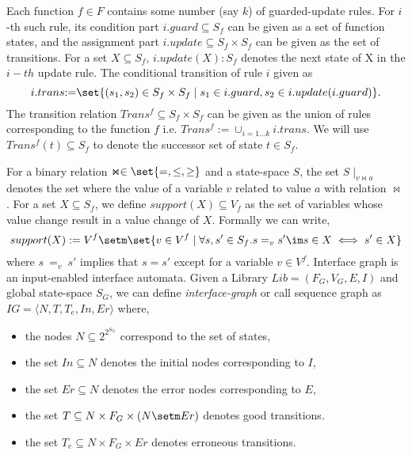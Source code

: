 \documentclass{llncs}
\begin{document}
Each function $f \in F$ contains some number (say $k$) of guarded-update rules. 
For  $i$-th such rule, its condition part $i.guard \subseteq S_f$ can be given as a set of function states, and the assignment part $i.update \subseteq S_f \times S_f$ can be given as the set of transitions.
For a set $X \subseteq S_f$, $i.update (X) : S_f$ denotes the next state of X in the $i-th$ update rule.
The conditional transition of rule $i$ given as 
\[
i.trans { := }  \set{(s_1, s_2) \in S_f \times S_f \mid s_1 \in i.guard, s_2 \in i.update(i.guard)}.
\]
The transition relation $Trans^f \subseteq S_f \times S_f$ can be given as the union of rules corresponding to the function $f$ i.e. $Trans^f {:=} \cup_{i=1 \ldots k}  i.trans$.
We will use $Trans^f (t) \subseteq S_f$ to denote the successor set of state $t \in S_f$.  

For a binary relation $\Join \in \set{=,\leq,\geq}$ and a state-space $S$, the set 
$S\mid_{v \Join a}$ denotes the set where the value of a variable $v$ related to value $a$ with relation $\Join$. 
For a set $X \subseteq S_f$, we define $support(X) \subseteq V_f$  as the set of variables whose
value change result in a value change of $X$.
Formally we can write, 
\[
support(X) := V^f \setm \set{v \in V^f \mid \forall s,s' \in S_f. s =_{v} s'  \im s\in X \iff s' \in X}
\]
where $s\ =_{v}\ s'$ implies that $s=s'$ except for a variable $v \in V^f$.
 Interface graph is an input-enabled interface automata.
 Given a Library $Lib = (F_G,V_G, E, I)$ and global state-space $S_G$,
 we can define  {\em interface-graph} or call sequence graph as  $IG = \langle N, T, T_{e},In, Er \rangle$ where, 
 \begin{itemize}
 \item the nodes $N \subseteq 2^{2^{S_G}}$ correspond to the set of states,
 \item the set $In \subseteq N$ denotes the initial nodes corresponding to $I$, 
 \item the set $Er \subseteq N$ denotes the error nodes corresponding to $E$,
 \item the set $T \subseteq N \times F_G \times (N\setm Er)$ denotes  good transitions.
  \item the set $T_{e} \subseteq N \times F_G \times Er$ denotes erroneous transitions.
 \end{itemize}
\end{document}
